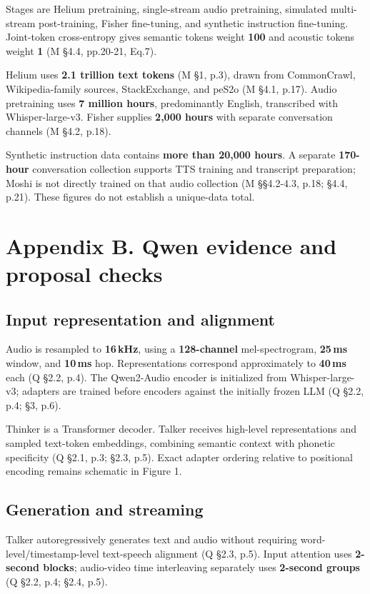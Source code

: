 \documentclass[11pt]{article}
\begin{document}
Stages are Helium pretraining, single-stream audio pretraining, simulated multi-stream post-training, Fisher fine-tuning, and synthetic instruction fine-tuning. Joint-token cross-entropy gives semantic tokens weight \textbf{100} and acoustic tokens weight \textbf{1} (M §4.4, pp.20-21, Eq.7).

Helium uses \textbf{2.1 trillion text tokens} (M §1, p.3), drawn from CommonCrawl, Wikipedia-family sources, StackExchange, and peS2o (M §4.1, p.17). Audio pretraining uses \textbf{7 million hours}, predominantly English, transcribed with Whisper-large-v3. Fisher supplies \textbf{2,000 hours} with separate conversation channels (M §4.2, p.18).

Synthetic instruction data contains \textbf{more than 20,000 hours}. A separate \textbf{170-hour} conversation collection supports TTS training and transcript preparation; Moshi is not directly trained on that audio collection (M §§4.2-4.3, p.18; §4.4, p.21). These figures do not establish a unique-data total.

\newpage
\section*{Appendix B. Qwen evidence and proposal checks}

\subsection*{Input representation and alignment}

Audio is resampled to \textbf{16\,kHz}, using a \textbf{128-channel} mel-spectrogram, \textbf{25\,ms} window, and \textbf{10\,ms} hop. Representations correspond approximately to \textbf{40\,ms} each (Q §2.2, p.4). The Qwen2-Audio encoder is initialized from Whisper-large-v3; adapters are trained before encoders against the initially frozen LLM (Q §2.2, p.4; §3, p.6).

Thinker is a Transformer decoder. Talker receives high-level representations and sampled text-token embeddings, combining semantic context with phonetic specificity (Q §2.1, p.3; §2.3, p.5). Exact adapter ordering relative to positional encoding remains schematic in Figure 1.

\subsection*{Generation and streaming}

Talker autoregressively generates text and audio without requiring word-level/timestamp-level text-speech alignment (Q §2.3, p.5). Input attention uses \textbf{2-second blocks}; audio-video time interleaving separately uses \textbf{2-second groups} (Q §2.2, p.4; §2.4, p.5).
\end{document}
